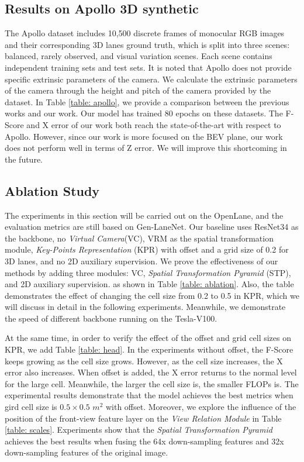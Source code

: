 \documentclass[10pt,twocolumn,letterpaper]{article}
\begin{document}
\subsection{Results on Apollo 3D synthetic}
\label{subsec: apollo}
The Apollo dataset \cite{guo2020gen} includes 10,500 discrete frames of monocular RGB images and their corresponding 3D lanes ground truth, which is split into three scenes: balanced, rarely observed, and visual variation scenes. Each scene contains independent training sets and test sets. It is noted that Apollo does not provide specific extrinsic parameters of the camera. We calculate the extrinsic parameters of the camera through the height and pitch of the camera provided by the dataset. In Table \ref{table: apollo}, we provide a comparison between the previous works and our work. Our model has trained 80 epochs on these datasets. The F-Score and X error of our work both reach the state-of-the-art with respect to Apollo. However, since our work is more focused on the BEV plane, our work does not perform well in terms of Z error. We will improve this shortcoming in the future.


\subsection{Ablation Study}
\label{sec: ablation}
The experiments in this section will be carried out on the OpenLane, and the evaluation metrics are still based on Gen-LaneNet\cite{guo2020gen}. Our baseline uses ResNet34 as the backbone, no \textit{Virtual Camera}(VC), VRM \cite{pan2020cross} as the spatial transformation module, \textit{Key-Points Representation} (KPR) with offset and a grid size of 0.2 for 3D lanes, and no 2D auxiliary supervision. We prove the effectiveness of our methods by adding three modules: VC, \textit{Spatial Transformation Pyramid} (STP), and 2D auxiliary supervision. as shown in Table \ref{table: ablation}. Also, the table demonstrates the effect of changing the cell size from 0.2 to 0.5 in KPR, which we will discuss in detail in the following experiments. Meanwhile, we demonstrate the speed of different backbone running on the Tesla-V100.


At the same time, in order to verify the effect of the offset and grid cell sizes on KPR, we add Table \ref{table: head}. In the experiments without offset, the F-Score keeps growing as the cell size grows. However, as the cell size increases, the X error also increases. When offset is added, the X error returns to the normal level for the large cell. Meanwhile, the larger the cell size is, the smaller FLOPs is. The experimental results demonstrate that the model achieves the best metrics when gird cell size is $0.5 \times 0.5$ ${m^2}$ with offset.
Moreover, we explore the influence of the position of the front-view feature layer on the \textit{View Relation Module}\cite{pan2020cross} in Table \ref{table: scales}. Experiments show that the \textit{Spatial Transformation Pyramid} achieves the best results when fusing the 64x down-sampling features and 32x down-sampling features of the original image.
\end{document}
